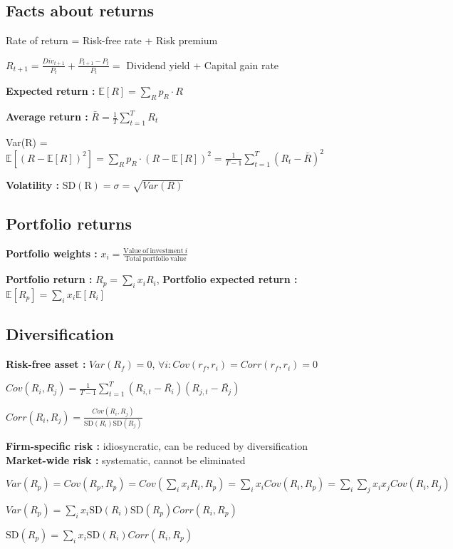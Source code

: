 \documentclass[a4paper,twocolumn]{article}
\newcommand{\E}[1] {\mathbb{E} [#1] }
\newcommand{\SD} {\mathrm{SD}}
\begin{document}
\subsection*{Facts about returns}

Rate of return = Risk-free rate + Risk premium

$R_{t+1} = \frac{Div_{t+1}}{P_t} + \frac{P_{t+1} - P_t}{P_t} =$ Dividend yield + Capital gain rate

\textbf{Expected return :} $\E{R} = \sum_R p_R \cdot R$

\textbf{Average return :} $\bar{R} = \frac{1}{T} \sum_{t=1}^T R_t$

Var(R) = $\E{(R - \E{R})^2} = \sum_R p_R \cdot (R - \E{R})^2 = \frac{1}{T-1} \sum_{t=1}^T (R_t - \bar{R})^2$

\textbf{Volatility :} $ \mathrm{SD(R)} = \sigma = \sqrt{Var(R)}$

\subsection*{Portfolio returns}

\textbf{Portfolio weights :} $x_i = \frac{\mathrm{Value\ of\ investment}\ i}{\mathrm{Total\ portfolio\ value}}$

\textbf{Portfolio return :} $R_p = \sum_i x_i R_i$, \textbf{Portfolio expected return :} $\E{R_p} = \sum_i x_i \E{R_i}$

\subsection*{Diversification}

\textbf{Risk-free asset :} $Var(R_f) = 0$, $\forall i : Cov(r_f, r_i) = Corr(r_f, r_i) = 0 $

$Cov(R_i, R_j) = \frac{1}{T-1} \sum_{t=1}^T (R_{i,t} - \bar{R_i})(R_{j,t} - \bar{R_j})$

$Corr(R_i, R_j) = \frac{Cov(R_i, R_j)}{\SD(R_i) \SD(R_j)}$

\textbf{Firm-specific risk :} idiosyncratic, can be reduced by diversification\\
\textbf{Market-wide risk :} systematic, cannot be eliminated

$Var(R_p) = Cov(R_p, R_p) = Cov(\sum_i x_i R_i, R_p) = \sum_i x_i Cov(R_i, R_p) = \sum_i \sum_j x_i x_j Cov(R_i, R_j)$

$Var(R_p) = \sum_i x_i \SD(R_i) \SD(R_p) Corr(R_i, R_p)$

$\SD(R_p) = \sum_i x_i \SD(R_i) Corr(R_i, R_p)$
\end{document}
